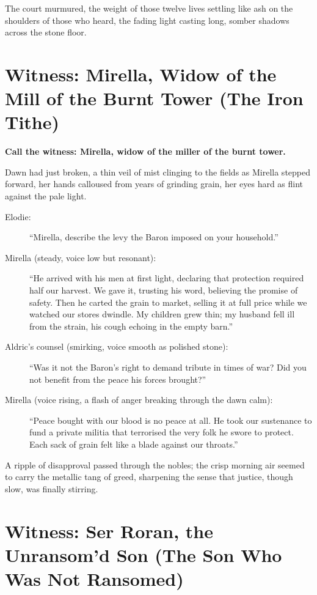 \documentclass[11pt,twoside]{book}
\begin{document}
The court murmured, the weight of those twelve lives settling like ash on the shoulders of those who heard, the fading light casting long, somber shadows across the stone floor.

\newpage

\section*{Witness: Mirella, Widow of the Mill of the Burnt Tower (The Iron Tithe)}

\textbf{Call the witness: Mirella, widow of the miller of the burnt tower.}

Dawn had just broken, a thin veil of mist clinging to the fields as Mirella stepped forward, her hands calloused from years of grinding grain, her eyes hard as flint against the pale light.

\begin{description}
\item[Elodie:] ``Mirella, describe the levy the Baron imposed on your household.''
\item[Mirella (steady, voice low but resonant):] ``He arrived with his men at first light, declaring that protection required half our harvest. We gave it, trusting his word, believing the promise of safety. Then he carted the grain to market, selling it at full price while we watched our stores dwindle. My children grew thin; my husband fell ill from the strain, his cough echoing in the empty barn.''
\item[Aldric's counsel (smirking, voice smooth as polished stone):] ``Was it not the Baron's right to demand tribute in times of war? Did you not benefit from the peace his forces brought?''
\item[Mirella (voice rising, a flash of anger breaking through the dawn calm):] ``Peace bought with our blood is no peace at all. He took our sustenance to fund a private militia that terrorised the very folk he swore to protect. Each sack of grain felt like a blade against our throats.''
\end{description}

A ripple of disapproval passed through the nobles; the crisp morning air seemed to carry the metallic tang of greed, sharpening the sense that justice, though slow, was finally stirring.

\newpage

\section*{Witness: Ser Roran, the Unransom'd Son (The Son Who Was Not Ransomed)}
\end{document}
